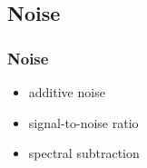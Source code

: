 
\subsection{Noise}

\begin{frame}
	\frametitle{Noise}
	\begin{itemize}
		\item additive noise
		\item signal-to-noise ratio
		\item spectral subtraction
	\end{itemize}
\end{frame}

